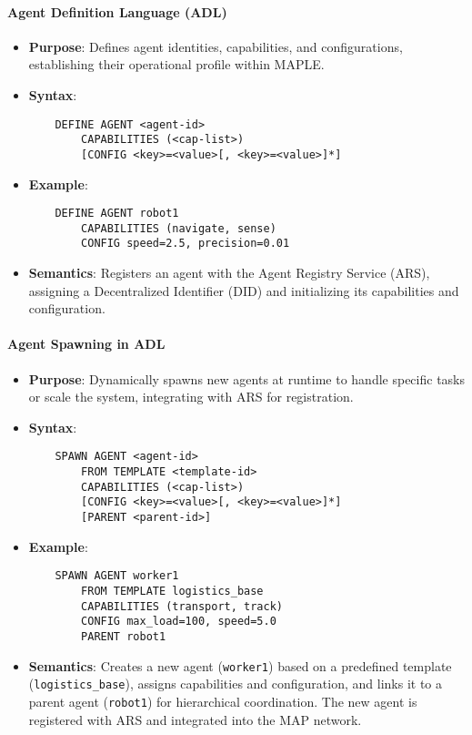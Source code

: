 \documentclass[a4paper,11pt]{article}
\begin{document}
\paragraph{Agent Definition Language (ADL)}
\begin{itemize}[leftmargin=*]
    \item \textbf{Purpose}: Defines agent identities, capabilities, and configurations, establishing their operational profile within MAPLE.
    \item \textbf{Syntax}: 
    \begin{verbatim}
    DEFINE AGENT <agent-id>
        CAPABILITIES (<cap-list>)
        [CONFIG <key>=<value>[, <key>=<value>]*]
    \end{verbatim}
    \item \textbf{Example}: 
    \begin{verbatim}
    DEFINE AGENT robot1
        CAPABILITIES (navigate, sense)
        CONFIG speed=2.5, precision=0.01
    \end{verbatim}
    \item \textbf{Semantics}: Registers an agent with the Agent Registry Service (ARS), assigning a Decentralized Identifier (DID) and initializing its capabilities and configuration.
\end{itemize}

\paragraph{Agent Spawning in ADL}
\begin{itemize}[leftmargin=*]
    \item \textbf{Purpose}: Dynamically spawns new agents at runtime to handle specific tasks or scale the system, integrating with ARS for registration.
    \item \textbf{Syntax}: 
    \begin{verbatim}
    SPAWN AGENT <agent-id>
        FROM TEMPLATE <template-id>
        CAPABILITIES (<cap-list>)
        [CONFIG <key>=<value>[, <key>=<value>]*]
        [PARENT <parent-id>]
    \end{verbatim}
    \item \textbf{Example}: 
    \begin{verbatim}
    SPAWN AGENT worker1
        FROM TEMPLATE logistics_base
        CAPABILITIES (transport, track)
        CONFIG max_load=100, speed=5.0
        PARENT robot1
    \end{verbatim}
    \item \textbf{Semantics}: Creates a new agent (\texttt{worker1}) based on a pre\-defined template (\texttt{logistics\_base}), assigns capabilities and configuration, and links it to a parent agent (\texttt{robot1}) for hierarchical coordination. The new agent is registered with ARS and integrated into the MAP network.
\end{itemize}
\end{document}

